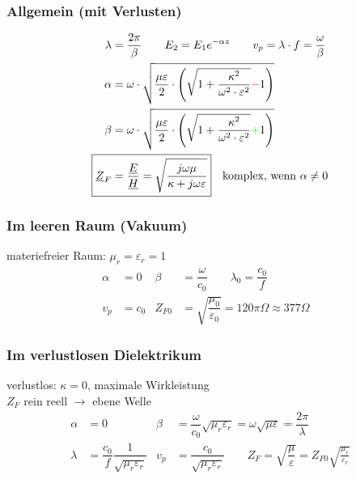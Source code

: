 \subsubsection{Allgemein (mit Verlusten)}
\begin{align*}
    \lambda                 & = \dfrac{2\pi}{\beta} \qquad E_2 = E_1 e^{-\alpha z}         \qquad                                                                            
    v_p                      = \lambda\cdot f = \dfrac{\omega}{\beta}                                                                                                    \\
    \alpha                  & = \omega \cdot \sqrt{\dfrac{\mu \varepsilon}{2}\cdot \left(\sqrt{1+\dfrac{\kappa^2}{\omega^2\cdot\varepsilon^2}}{\color{red}{-}}1\right)}   \\
    \beta                   & = \omega \cdot \sqrt{\dfrac{\mu \varepsilon}{2}\cdot \left(\sqrt{1+\dfrac{\kappa^2}{\omega^2\cdot\varepsilon^2}}{\color{green}{+}}1\right)} \\
    \Aboxed{\underline{Z}_F & = \dfrac{\underline{E}}{\underline{H}} = \sqrt{\dfrac{j\omega\mu}{\kappa+j\omega\varepsilon}}}\quad\text{komplex, wenn } \alpha \neq 0
\end{align*}

\subsubsection{Im leeren Raum (Vakuum)}
materiefreier Raum: $ \mu_r = \varepsilon_r = 1 $
\begin{align*}
    \alpha                     & = 0 &
    \beta                      & = \dfrac{\omega}{c_0} \qquad 
    \lambda_0                   = \dfrac{c_0}{f} \\
    v_p                        & = c_0 &
Z_{F0} & = \sqrt{\dfrac{\mu_0}{\varepsilon_0}} = 120 \pi\Omega\approx377\Omega &
\end{align*}
\subsubsection{Im verlustlosen Dielektrikum}
verlustlos: $\kappa =0$, maximale Wirkleistung\\
$Z_F$ rein reell $\rightarrow$ ebene Welle
\begin{align*}
    \alpha                  & = 0 &
    \beta                   & = \dfrac{\omega}{c_0}\sqrt{\mu_r\varepsilon_r}=\omega\sqrt{\mu\varepsilon}=\dfrac{2\pi}{\lambda} \\
    \lambda                 & = \dfrac{c_0}{f}\dfrac{1}{\sqrt{\mu_r\varepsilon_r}} &
    v_p                     & = \dfrac{c_0}{\sqrt{\mu_r\varepsilon_r}}         \qquad
    \boxed{Z_F = \sqrt{\dfrac{\mu}{\varepsilon}}=Z_{F0}\sqrt{\frac{\mu_r}{\varepsilon_r}}}
\end{align*}

